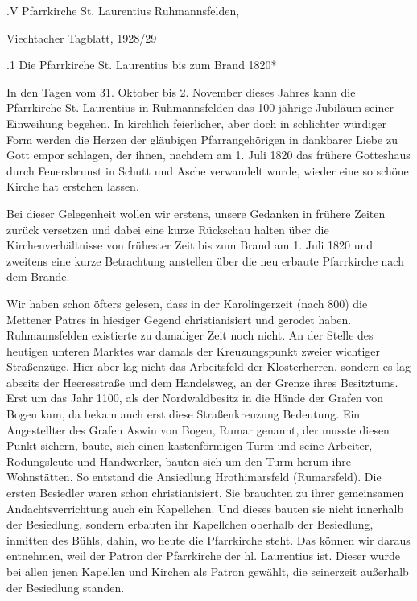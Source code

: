 \documentclass[12pt,a4paper]{book}
\begin{document}
.V Pfarrkirche St. Laurentius Ruhmannsfelden,

Viechtacher Tagblatt, 1928/29

.1 Die Pfarrkirche St. Laurentius bis zum Brand 1820*

In den Tagen vom 31. Oktober bis 2. November dieses Jahres kann die Pfarrkirche
St. Laurentius in Ruhmannsfelden das 100-jährige Jubiläum seiner Einweihung
begehen. In kirchlich feierlicher, aber doch in schlichter würdiger Form werden
die Herzen der gläubigen Pfarrangehörigen in dankbarer Liebe zu Gott empor
schlagen, der ihnen, nachdem am 1. Juli 1820 das frühere Gotteshaus durch
Feuersbrunst in Schutt und Asche verwandelt wurde, wieder eine so schöne Kirche
hat erstehen lassen.

Bei dieser Gelegenheit wollen wir erstens, unsere Gedanken in frühere Zeiten
zurück versetzen und dabei eine kurze Rückschau halten über die
Kirchenverhältnisse von frühester Zeit bis zum Brand am 1. Juli 1820 und
zweitens eine kurze Betrachtung anstellen über die neu erbaute Pfarrkirche nach
dem Brande.

Wir haben schon öfters gelesen, dass in der Karolingerzeit (nach 800) die
Mettener Patres in hiesiger Gegend christianisiert und gerodet haben.
Ruhmannsfelden existierte zu damaliger Zeit noch nicht. An der Stelle des
heutigen unteren Marktes war damals der Kreuzungspunkt zweier wichtiger
Straßenzüge. Hier aber lag nicht das Arbeitsfeld der Klosterherren, sondern es
lag abseits der Heeresstraße und dem Handelsweg, an der Grenze ihres Besitztums.
Erst um das Jahr 1100, als der Nordwaldbesitz in die Hände der Grafen von Bogen
kam, da bekam auch erst diese Straßenkreuzung Bedeutung. Ein Angestellter des
Grafen Aswin von Bogen, Rumar genannt, der musste diesen Punkt sichern, baute,
sich einen kastenförmigen Turm und seine Arbeiter, Rodungsleute und Handwerker,
bauten sich um den Turm herum ihre Wohnstätten. So entstand die Ansiedlung
Hrothimarsfeld (Rumarsfeld). Die ersten Besiedler waren schon christianisiert.
Sie brauchten zu ihrer gemeinsamen Andachtsverrichtung auch ein Kapellchen. Und
dieses bauten sie nicht innerhalb der Besiedlung, sondern erbauten ihr
Kapellchen oberhalb der Besiedlung, inmitten des Bühls, dahin, wo heute die
Pfarrkirche steht. Das können wir daraus entnehmen, weil der Patron der
Pfarrkirche der hl. Laurentius ist. Dieser wurde bei allen jenen Kapellen und
Kirchen als Patron gewählt, die seinerzeit außerhalb der Besiedlung standen.
\end{document}
